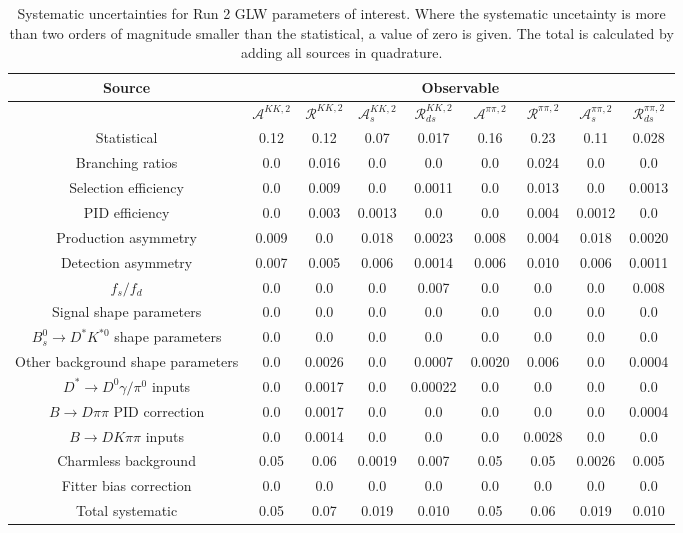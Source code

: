 \begin{sidewaystable}
  \centering
  \begin{tabular}{ccccccccc}
      \toprule
      Source & \multicolumn{8}{c}{Observable} \\
      \midrule
       & $\mathcal{A}^{KK,2}$ & $\mathcal{R}^{KK,2}$ & $\mathcal{A}_s^{KK,2}$ & $\mathcal{R}_{ds}^{KK,2}$ & $\mathcal{A}^{\pi\pi,2}$ & $\mathcal{R}^{\pi\pi,2}$ & $\mathcal{A}_s^{\pi\pi,2}$ & $\mathcal{R}_{ds}^{\pi\pi,2}$ \\
      \midrule
      Statistical & 0.12 & 0.12 & 0.07 & 0.017 & 0.16 & 0.23 & 0.11 & 0.028 \\
      \midrule
      Branching ratios & 0.0  & 0.016 & 0.0  & 0.0  & 0.0  & 0.024 & 0.0  & 0.0  \\
      Selection efficiency & 0.0  & 0.009 & 0.0  & 0.0011 & 0.0  & 0.013 & 0.0  & 0.0013 \\
      PID efficiency & 0.0  & 0.003 & 0.0013 & 0.0  & 0.0  & 0.004 & 0.0012 & 0.0  \\
      Production asymmetry & 0.009 & 0.0  & 0.018 & 0.0023 & 0.008 & 0.004 & 0.018 & 0.0020 \\
      Detection asymmetry & 0.007 & 0.005 & 0.006 & 0.0014 & 0.006 & 0.010 & 0.006 & 0.0011 \\
      $f_s/f_d$ & 0.0  & 0.0  & 0.0  & 0.007 & 0.0  & 0.0  & 0.0  & 0.008 \\
      Signal shape parameters & 0.0  & 0.0  & 0.0  & 0.0  & 0.0  & 0.0  & 0.0  & 0.0  \\
      $B^0_s \to D^* K^{*0}$ shape parameters & 0.0  & 0.0  & 0.0  & 0.0  & 0.0  & 0.0  & 0.0  & 0.0  \\
      Other background shape parameters & 0.0  & 0.0026 & 0.0  & 0.0007 & 0.0020 & 0.006 & 0.0  & 0.0004 \\
      $D^* \to D^0 \gamma/\pi^0$ inputs & 0.0  & 0.0017 & 0.0  & 0.00022 & 0.0  & 0.0  & 0.0  & 0.0  \\
      $B\to D\pi\pi$ PID correction & 0.0  & 0.0017 & 0.0  & 0.0  & 0.0  & 0.0  & 0.0  & 0.0004 \\
      $B\to DK\pi\pi$ inputs & 0.0  & 0.0014 & 0.0  & 0.0  & 0.0  & 0.0028 & 0.0  & 0.0  \\
      Charmless background & 0.05 & 0.06 & 0.0019 & 0.007 & 0.05 & 0.05 & 0.0026 & 0.005 \\
      Fitter bias correction & 0.0  & 0.0  & 0.0  & 0.0  & 0.0  & 0.0  & 0.0  & 0.0  \\
      \midrule
      Total systematic & 0.05 & 0.07 & 0.019 & 0.010 & 0.05 & 0.06 & 0.019 & 0.010 \\
      \bottomrule
  \end{tabular}
  \caption{Systematic uncertainties for Run 2 GLW parameters of interest. Where the systematic uncetainty is more than two orders of magnitude smaller than the statistical, a value of zero is given. The total is calculated by adding all sources in quadrature.}
\label{tab:KK_run2_systematics}
\end{sidewaystable}
